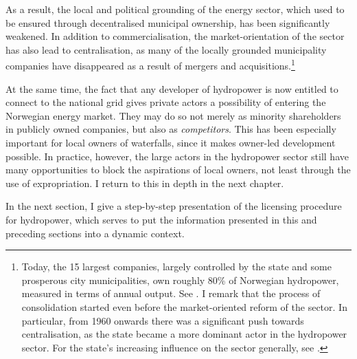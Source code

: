 As a result, the local and political grounding of the energy sector, which used to be ensured through decentralised municipal ownership, has been significantly weakened. In addition to commercialisation, the market-orientation of the sector has also lead to centralisation, as many of the locally grounded municipality companies have disappeared as a result of mergers and acquisitions.\footnote{Today, the 15 largest companies, largely controlled by the state and some prosperous city municipalities, own roughly 80\% of Norwegian hydropower, measured in terms of annual output. See \cite[28]{otprp61}. I remark that the process of consolidation started even before the market-oriented reform of the sector. In particular, from 1960 onwards there was a significant push towards centralisation, as the state became a more dominant actor in the hydropower sector. For the state's increasing influence on the sector generally, see \cite{skjold06,thue06b}.}

At the same time, the fact that any developer of hydropower is now entitled to connect to the national grid gives private actors a possibility of entering the Norwegian energy market. They may do so not merely as minority shareholders in publicly owned companies, but also as {\it competitors}. This has been especially important for local owners of waterfalls, since it makes owner-led development possible. In practice, however, the large actors in the hydropower sector still have many opportunities to block the aspirations of local owners, not least through the use of expropriation. I return to this in depth in the next chapter.

In the next section, I give a step-by-step presentation of the licensing procedure for hydropower, which serves to put the information presented in this and preceding sections into a dynamic context.


